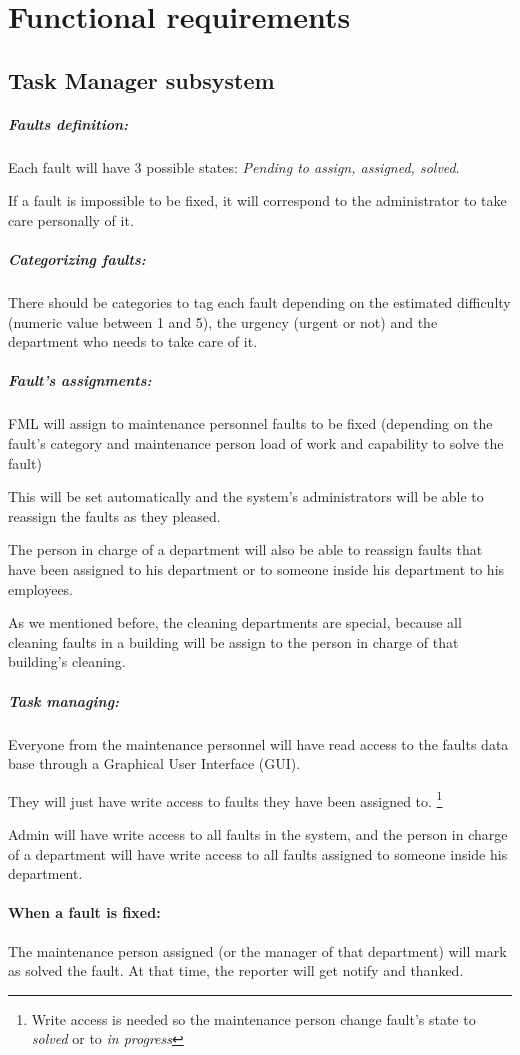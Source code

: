 \section{Functional requirements}

\subsection{Task Manager subsystem}


\subparagraph{Faults definition: } Each fault will have 3 possible states: \textit{Pending to assign, assigned, solved}. 

If a fault is impossible to be fixed, it will correspond to the administrator to take care personally of it.


\subparagraph{Categorizing faults: } There should be categories to tag each fault depending on the estimated difficulty (numeric value between 1 and 5), the urgency (urgent or not) and the department who needs to take care of it.


\subparagraph{Fault's assignments: } FML will assign to maintenance personnel faults to be fixed (depending on the fault's category and maintenance person load of work and capability to solve the fault)

This will be set automatically and the system's administrators will be able to reassign the faults as they pleased.

The person in charge of a department will also be able to reassign faults that have been assigned to his department or to someone inside his department to his employees.

As we mentioned before, the cleaning departments are special, because all cleaning faults in a building will be assign to the person in charge of that building's cleaning.


\subparagraph{Task managing: } Everyone from the maintenance personnel will have read access to the faults data base through a Graphical User Interface (GUI). 

They will just have write access to faults they have been assigned to. \footnote{Write access is needed so the maintenance person change fault's state to \textit{solved} or to \textit{in progress}}

Admin will have write access to all faults in the system, and the person in charge of a department will have write access to all faults assigned to someone inside his department.


\paragraph{When a fault is fixed: } The maintenance person assigned (or the manager of that department) will mark as solved the fault. At that time, the reporter will get notify and thanked. 


